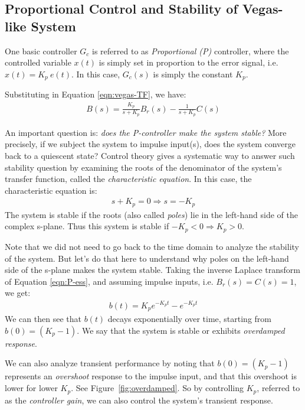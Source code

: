 \documentclass{article}
\begin{document}
\subsection{Proportional Control and Stability of Vegas-like System}

One basic controller $G_c$ is referred to as {\em Proportional (P)} controller, where
the controlled variable $x(t)$ is simply set in proportion to the error signal,
i.e. $x(t) = K_p\ e(t)$.
In this case, $G_c(s)$ is simply the constant $K_p$. 

Substituting in Equation \ref{eqn:vegas-TF}, we have:
\begin{eqnarray}
B(s) = \frac{K_p}{s + K_p} B_r(s) - \frac{1}{s + K_p} C(s)
\label{eqn:P-ess}
\end{eqnarray}

An important question is: {\em does the P-controller make the system stable?}
More precisely, if we subject the system to impulse input(s),
does the system converge back to a quiescent state?
Control theory gives a systematic way to answer such stability question by
examining the roots of the denominator of the system's transfer function,
called the {\em characteristic equation}. 
In this case,
the characteristic equation is:
\begin{eqnarray*}
s + K_p = 0 \Rightarrow s = - K_p
\end{eqnarray*}
The system is stable if the roots (also called {\em poles}) lie in the left-hand side of the complex s-plane.
Thus this system is stable if $- K_p < 0 \Rightarrow K_p > 0$.

Note that we did not need to go back to the time domain to analyze the stability of the system.
But let's do that here to understand why poles on the  left-hand side of the s-plane makes the system stable.
Taking the inverse Laplace transform of  Equation \ref{eqn:P-ess}, and assuming impulse inputs,
i.e. $B_r(s) = C(s) = 1$, we get:
\begin{eqnarray*}
b(t) = K_p e^{-K_p t} - e^{-K_p t}
\end{eqnarray*}
We can then see that $b(t)$ decays exponentially over time, starting from $b(0)=(K_p-1)$.
We say that the system is stable or exhibits {\em overdamped response}.

We can also analyze transient performance by noting that
$b(0)=(K_p-1)$ represents an {\em overshoot} response to the impulse input,
and that this overshoot is lower for lower $K_p$.
See Figure~\ref{fig:overdamped}.
So by controlling $K_p$, referred to as the {\em controller gain},
we can also control the system's transient response.
\end{document}
